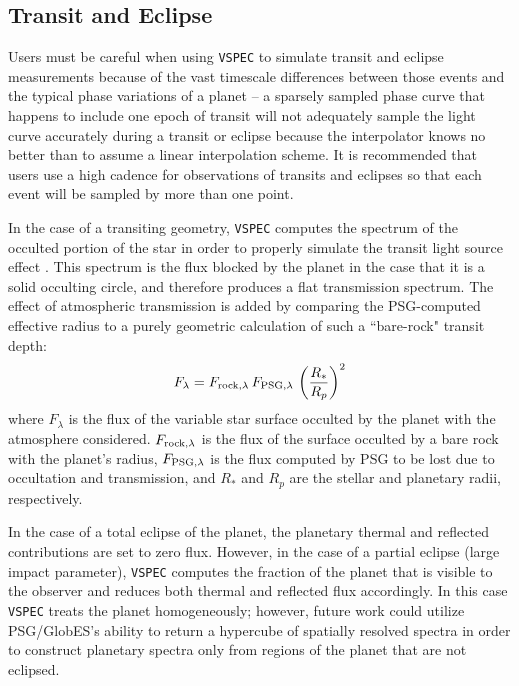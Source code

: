 \documentclass[linenumbers,preprint,authoryear]{elsarticle}
\newcommand{\vspec}[1]{\texttt{VSPEC}#1}
\begin{document}
\subsection{Transit and Eclipse}
Users must be careful when using \vspec{} to simulate transit and eclipse measurements because of the vast timescale differences between those events and the typical phase variations of a planet -- a sparsely sampled phase curve that happens to include one epoch of transit will not adequately sample the light curve accurately during a transit or eclipse because the interpolator knows no better than to assume a linear interpolation scheme. It is recommended that users use a high cadence for observations of transits and eclipses so that each event will be sampled by more than one point.

In the case of a transiting geometry, \vspec{} computes the spectrum of the occulted portion of the star in order to properly simulate the transit light source effect \citep[TLS][]{rackham2018}. This spectrum is the flux blocked by the planet in the case that it is a solid occulting circle, and therefore produces a flat transmission spectrum. The effect of atmospheric transmission is added by comparing the PSG-computed effective radius to a purely geometric calculation of such a ``bare-rock" transit depth:
\begin{equation}
    F_{\lambda} = F_{{\rm rock}, \lambda}\, F_{{\rm PSG,} \lambda} \,\left (\frac{R_*}{R_p} \right )^2
\end{equation}
where $F_\lambda$ is the flux of the variable star surface occulted by the planet with the atmosphere considered. $F_{{\rm rock}, \lambda}$ is the flux of the surface occulted by a bare rock with the planet's radius, $F_{{\rm PSG,} \lambda}$ is the flux computed by PSG to be lost
due to occultation and transmission, and $R_*$ and $R_p$ are the stellar and planetary radii, respectively.

In the case of a total eclipse of the planet, the planetary thermal and reflected contributions are set to zero flux. However, in the case of a partial eclipse (large impact parameter), \vspec{} computes the fraction of the planet that is visible to the observer and reduces both thermal and reflected flux accordingly. In this case \vspec{} treats the planet homogeneously; however, future work could utilize PSG/GlobES's ability to return a hypercube of spatially resolved spectra in order to construct planetary spectra only from regions of the planet that are not eclipsed.
\end{document}
